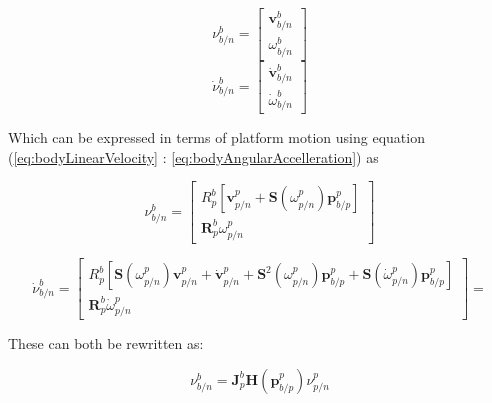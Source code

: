 \begin{equation}
\nu_{b/n}^{b} = \begin{bmatrix}\textbf{v}_{b/n}^{b} \\[10pt] \omega_{b/n}^{b} \end{bmatrix}
\end{equation}
\begin{equation}
\dot{\nu}_{b/n}^{b} = \begin{bmatrix}\dot{\textbf{v}}_{b/n}^{b} \\[10pt] \dot{\omega}_{b/n}^{b} \end{bmatrix}
\end{equation}

Which can be expressed in terms of platform motion using equation (\ref{eq:bodyLinearVelocity} : \ref{eq:bodyAngularAccelleration}) as

\begin{equation}
\nu_{b/n}^{b} = \begin{bmatrix}R_{p}^{b}[ \textbf{v}_{p/n}^{p} + \textbf{S}(\omega_{p/n}^{p}) \textbf{p}_{b/p}^{p}] \\[10pt] 
\textbf{R}_{p}^{b}\omega_{p/n}^{p} \end{bmatrix}
\label{eq:vectorSpeed}
\end{equation}

\begin{equation}
\dot{\nu}_{b/n}^{b} =  \begin{bmatrix}
R_{p}^{b} [\textbf{S}(\omega_{p/n}^{p}) \textbf{v}_{p/n}^{p} + \dot{\textbf{v}}_{p/n}^{p} + \textbf{S}^{2}(\omega_{p/n}^{p}) \textbf{p}_{b/p}^{p} + \textbf{S}(\dot{\omega}_{p/n}^{p})\textbf{p}_{b/p}^{p} ] 
\\[10pt] \textbf{R}_{p}^{b} \dot{\omega}_{p/n}^{p} \end{bmatrix} = 
\label{eq:vectorAccelleration}
\end{equation}

These can both be rewritten as:

\begin{equation}
\nu_{b/n}^{b} =  \textbf{J}_{p}^{b} \textbf{H}(\textbf{p}_{b/p}^{p}) \nu_{p/n}^{p}
\label{eq:vectorSpeed2}
\end{equation}

